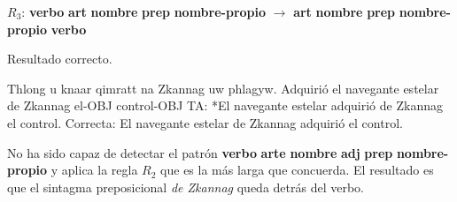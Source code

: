 \begin{enumerate}
\begin{example}
\end{example} $R_3$: \textbf{verbo} \textbf{art} \textbf{nombre} \textbf{prep} \textbf{nombre-propio} $\rightarrow$ \textbf{art} \textbf{nombre} \textbf{prep} \textbf{nombre-propio} \textbf{verbo} 

Resultado correcto. 

\begin{example} \gll Thlong u knaar qimratt na Zkannag uw phlagyw. {Adquirió} el navegante estelar de Zkannag el-OBJ control-OBJ \glt TA: *El navegante estelar adquirió de Zkannag el control. \glt Correcta: El navegante estelar de Zkannag adquirió el control. \glend

\end{example} 

No ha sido capaz de detectar el patrón \textbf{verbo} \textbf{arte} \textbf{nombre} \textbf{adj} \textbf{prep} \textbf{nombre-propio} y aplica la regla $R_2$ que es la más larga que concuerda. El resultado es que el sintagma preposicional \emph{de Zkannag} queda detrás del verbo. 


\end{enumerate}

